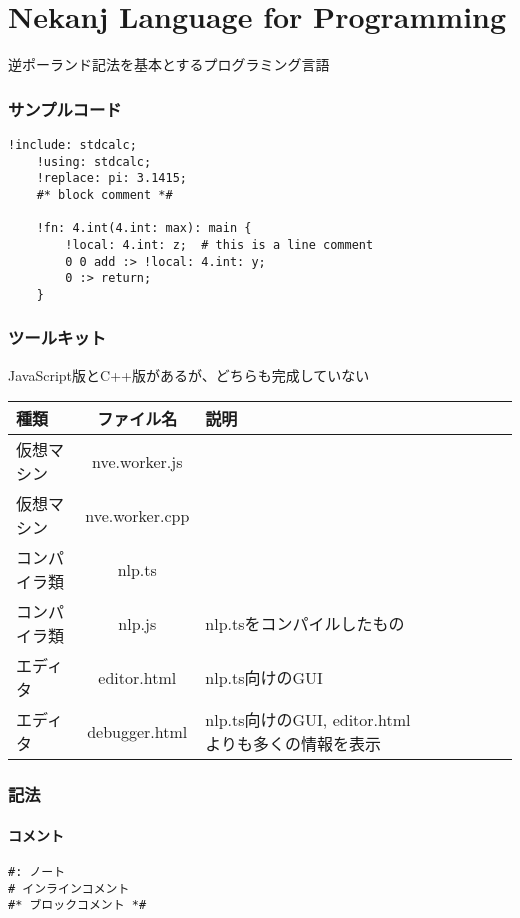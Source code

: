 \part{Nekanj Language for Programming}

逆ポーランド記法を基本とするプログラミング言語

\section{サンプルコード}
\begin{lstlisting}[]
    !include: stdcalc;
    !using: stdcalc;
    !replace: pi: 3.1415;
    #* block comment *#

    !fn: 4.int(4.int: max): main {
        !local: 4.int: z;  # this is a line comment
        0 0 add :> !local: 4.int: y;
        0 :> return;
    }
\end{lstlisting}

\section{ツールキット}
JavaScript版とC++版があるが、どちらも完成していない
\begin{table}[h]
    \centering
    \begin{tabular}{lcllllll}
        \hline
        種類 & ファイル名 & 説明 \\
        \hline \hline
        仮想マシン & nve.worker.js \\
        仮想マシン & nve.worker.cpp \\
        \hline
        コンパイラ類 & nlp.ts \\
        コンパイラ類 & nlp.js & nlp.tsをコンパイルしたもの \\
        \hline
        エディタ & editor.html & nlp.ts向けのGUI \\
        エディタ & debugger.html & nlp.ts向けのGUI, editor.htmlよりも多くの情報を表示 \\
        \hline
    \end{tabular}
\end{table}


\section{記法}

\subsection{コメント}
\begin{lstlisting}[]
#: ノート
# インラインコメント
#* ブロックコメント *#
\end{lstlisting}

